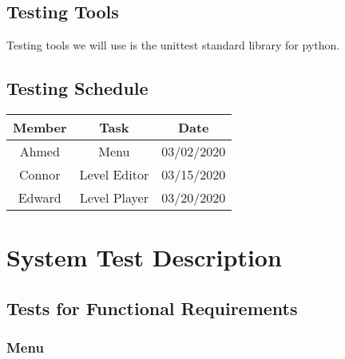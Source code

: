 \documentclass[12pt, titlepage]{article}
\begin{document}
\subsection{Testing Tools}
Testing tools we will use is the unittest standard library for python.

\subsection{Testing Schedule}

\begin{tabular}[pos]{|c|c|c|}
\hline
\textbf{Member}& \textbf{Task} & \textbf{Date} \\ \hline
Ahmed & Menu & 03/02/2020\\ \hline
Connor & Level Editor & 03/15/2020\\ \hline
Edward & Level Player & 03/20/2020\\ \hline
\end{tabular}

\newpage

\section{System Test Description}
	
\subsection{Tests for Functional Requirements}

\subsubsection{Menu}
\end{document}

